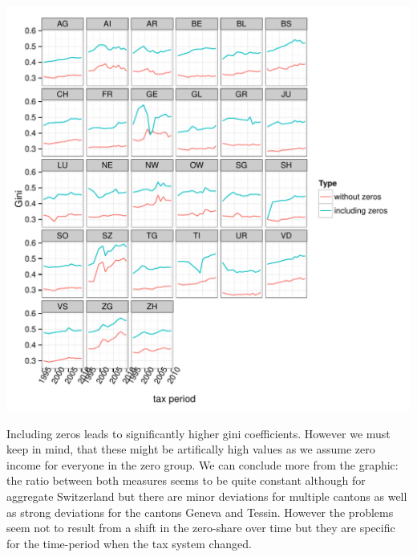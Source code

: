\begin{knitrout}
\begin{kframe}
{\ttfamily\noindent\itshape\color{messagecolor}{\#\# 'opts' is deprecated. Use 'theme' instead. (Deprecated; last used in version 0.9.1)\\\#\# theme\_text is deprecated. Use 'element\_text' instead. (Deprecated; last used in version 0.9.1)}}\end{kframe}
\includegraphics[width=\maxwidth]{figure/with_without_zeros2} 

\end{knitrout}


Including zeros leads to significantly higher gini coefficients. However we must keep in mind, that these might be artifically high values as we assume zero income for everyone in the zero group. We can conclude more from the graphic: the ratio between both measures seems to be quite constant although for aggregate Switzerland but there are minor deviations for multiple cantons as well as strong deviations for the cantons Geneva and Tessin. However the problems seem not to result from a shift in the zero-share over time but they are specific for the time-period when the tax system changed. 


